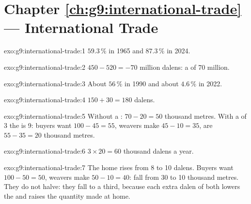 \section*{Chapter \ref{ch:g9:international-trade} --- International Trade}

\begin{solution}{exo:g9:international-trade:1}
$59.3\,\%$ in 1965 and $87.3\,\%$ in 2024.
\end{solution}

\begin{solution}{exo:g9:international-trade:2}
$450 - 520 = -70$ million dalens: a  of 70 million.
\end{solution}

\begin{solution}{exo:g9:international-trade:3}
About $56\,\%$ in 1990 and about $4.6\,\%$ in 2022.
\end{solution}

\begin{solution}{exo:g9:international-trade:4}
$150 + 30 = 180$ dalens.
\end{solution}

\begin{solution}{exo:g9:international-trade:5}
Without a : $70 - 20 = 50$ thousand metres. With a  of 3 the  is 9: buyers want
$100 - 45 = 55$, weavers make $45 - 10 = 35$,  are $55 - 35 = 20$ thousand metres.
\end{solution}

\begin{solution}{exo:g9:international-trade:6}
$3 \times 20 = 60$ thousand dalens a year.
\end{solution}

\begin{solution}{exo:g9:international-trade:7}
The home  rises from 8 to 10 dalens. Buyers want $100 - 50 = 50$, weavers make $50 - 10 = 40$: 
fall from 30 to 10 thousand metres. They do not halve: they fall to a third, because each extra dalen of
 both lowers the  and raises the quantity made at home.
\end{solution}

